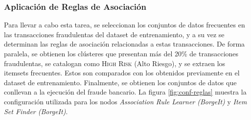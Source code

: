 \subsubsection{Aplicación de Reglas de Asociación}

Para llevar a cabo esta tarea, se seleccionan los conjuntos de datos frecuentes en las transacciones fraudulentas del dataset de entrenamiento,  y a su vez se determinan las reglas de asociación relacionadas a estas transacciones. De forma paralela, se obtienen los clústeres que presentan más del 20\% de transacciones fraudulentas, se catalogan como \textsc{High Risk} (Alto Riesgo), y se extraen los itemsets frecuentes. Estos son comparados con los obtenidos previamente en el dataset de entrenamiento. Finalmente, se obtienen los conjuntos de datos que conllevan a la ejecución del fraude bancario. La figura \ref{fig:conf-reglas} muestra la configuración utilizada para los nodos \textit{Association Rule Learner (BorgeIt)} y \textit{Item Set Finder (BorgeIt)}.

